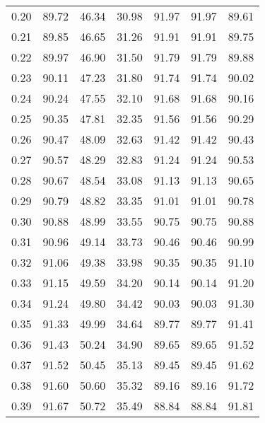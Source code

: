 \begin{tabular}{|c|c|c|c|c|c|c|}
      0.20 &     89.72 &     46.34 &      30.98 &   91.97 &      91.97 &         89.61 \\
      0.21 &     89.85 &     46.65 &      31.26 &   91.91 &      91.91 &         89.75 \\
      0.22 &     89.97 &     46.90 &      31.50 &   91.79 &      91.79 &         89.88 \\
      0.23 &     90.11 &     47.23 &      31.80 &   91.74 &      91.74 &         90.02 \\
      0.24 &     90.24 &     47.55 &      32.10 &   91.68 &      91.68 &         90.16 \\
      0.25 &     90.35 &     47.81 &      32.35 &   91.56 &      91.56 &         90.29 \\
      0.26 &     90.47 &     48.09 &      32.63 &   91.42 &      91.42 &         90.43 \\
      0.27 &     90.57 &     48.29 &      32.83 &   91.24 &      91.24 &         90.53 \\
      0.28 &     90.67 &     48.54 &      33.08 &   91.13 &      91.13 &         90.65 \\
      0.29 &     90.79 &     48.82 &      33.35 &   91.01 &      91.01 &         90.78 \\
      0.30 &     90.88 &     48.99 &      33.55 &   90.75 &      90.75 &         90.88 \\
      0.31 &     90.96 &     49.14 &      33.73 &   90.46 &      90.46 &         90.99 \\
      0.32 &     91.06 &     49.38 &      33.98 &   90.35 &      90.35 &         91.10 \\
      0.33 &     91.15 &     49.59 &      34.20 &   90.14 &      90.14 &         91.20 \\
      0.34 &     91.24 &     49.80 &      34.42 &   90.03 &      90.03 &         91.30 \\
      0.35 &     91.33 &     49.99 &      34.64 &   89.77 &      89.77 &         91.41 \\
      0.36 &     91.43 &     50.24 &      34.90 &   89.65 &      89.65 &         91.52 \\
      0.37 &     91.52 &     50.45 &      35.13 &   89.45 &      89.45 &         91.62 \\
      0.38 &     91.60 &     50.60 &      35.32 &   89.16 &      89.16 &         91.72 \\
      0.39 &     91.67 &     50.72 &      35.49 &   88.84 &      88.84 &         91.81 \\

\end{tabular}
